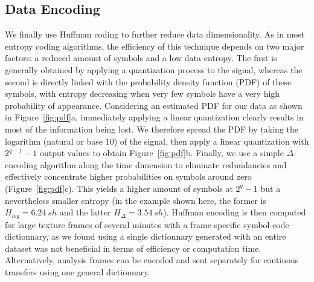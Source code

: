 \documentclass[final,3p,times,twocolumn]{elsarticle}
\begin{document}
\subsection{Data Encoding}
We finally use Huffman coding to further reduce data dimensionality. As in most entropy coding algorithms, the efficiency of this technique depends on two major factors: a reduced amount of symbols and a low data entropy. The first is generally obtained by applying a quantization process to the signal, whereas the second is directly linked with the probability density function (PDF) of these symbols, with entropy decreasing when very few symbols have a very high probability of appearance. Considering an estimated PDF for our data as shown in Figure~\ref{fig:pdf}a, immediately applying a linear quantization clearly results in most of the information being lost. We therefore spread the PDF by taking the logarithm (natural or base 10) of the signal, then apply a linear quantization with $2^{q-1}-1$ output values to obtain Figure~\ref{fig:pdf}b. Finally, we use a simple $\Delta$-encoding algorithm along the time dimension to eliminate redundancies and effectively concentrate higher probabilities on symbols around zero (Figure~\ref{fig:pdf}c). This yields a higher amount of symbols at $2^q-1$ but a nevertheless smaller entropy (in the example shown here, the former is $H_{log} = 6.24~sh$ and the latter $H_{\Delta} = 3.54~sh$). Huffman encoding is then computed for large texture frames of several minutes with a frame-specific symbol-code dictionnary, as we found using a single dictionnary generated with an entire dataset was not beneficial in terms of efficiency or computation time. Alternatively, analysis frames can be encoded and sent separately for continous transfers using one general dictionnary.\\
\end{document}
